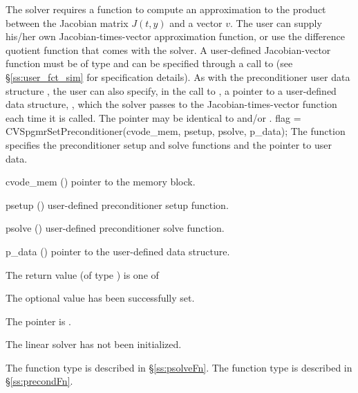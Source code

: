 The 
{\cvspgmr} solver requires a function to compute an approximation to the
product between the Jacobian matrix $J(t,y)$ and a vector $v$.
The user can supply his/her own Jacobian-times-vector approximation function, 
or use the difference quotient function  
that comes with the {\cvspgmr} solver.
A user-defined Jacobian-vector function must be of type  and 
can be specified through a call to  
(see \S\ref{ss:user_fct_sim} for specification details).
As with the preconditioner user data structure , 
the user can also specify, in the call to , a pointer to a 
user-defined data structure, , which
the {\cvspgmr} solver passes to the Jacobian-times-vector function 
each time it is called.  
The pointer  may be identical to  and/or .
{
  flag = CVSpgmrSetPreconditioner(cvode\_mem, psetup, psolve, p\_data);
}
{
  The function  specifies the preconditioner
  setup and solve functions and the pointer to user data.
}
{
  \begin{args}
  \item[cvode\_mem] ()
    pointer to the {\cvode} memory block.
  \item[psetup] ()
    user-defined preconditioner setup function.
  \item[psolve] ()
    user-defined preconditioner solve function.
  \item[p\_data] ()
     pointer to the user-defined data structure.
  \end{args}
}
{
  The return value  (of type ) is one of
  \begin{args}
  \item[\Id{CVSPGMR\_SUCCESS}] 
    The optional value has been successfully set.
  \item[\Id{CVSPGMR\_MEM\_NULL}]
    The  pointer is .
  \item[\Id{CVSPGMR\_LMEM\_NULL}]
    The {\cvspgmr} linear solver has not been initialized.
  \end{args}
}
{
   The function type  is described in \S\ref{ss:psolveFn}.
   The function type  is described in \S\ref{ss:precondFn}.
}
